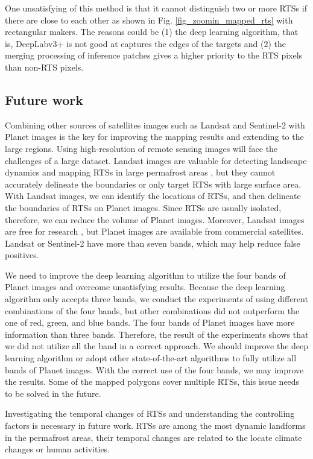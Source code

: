 \documentclass[preprint,12pt,authoryear]{elsarticle}
\begin{document}
One unsatisfying of this method is that it cannot distinguish two or more RTSs if there are close to each other as shown in Fig. \ref{fig_zoomin_mapped_rts} with rectangular makers. The reasons could be (1) the deep learning algorithm, that is, DeepLabv3+ is not good at captures the edges of the targets and (2) the merging processing of inference patches gives a higher priority to the RTS pixels than non-RTS pixels.

\subsection{Future work}
\label{subsec_future}

Combining other sources of satellites images such as Landsat and Sentinel-2 with Planet images is the key for improving the mapping results and extending to the large regions. Using high-resolution of remote sensing images will face the challenges of a large dataset. Landsat images are valuable for detecting landscape dynamics and mapping RTSs in large permafrost areas \citep{nitze_detection_2016, nitze_landsat-based_2017, nitze2018remote}, but they cannot accurately delineate the boundaries or only target RTSs with large surface area. With Landsat images, we can identify the locations of RTSs, and then delineate the boundaries of RTSs on Planet images. Since RTSs are usually isolated, therefore, we can reduce the volume of Planet images. Moreover, Landsat images are free for research \citep{zhu2019benefits}, but Planet images are available from commercial satellites. Landsat or Sentinel-2 have more than seven bands, which may help reduce false positives. 

We need to improve the deep learning algorithm to utilize the four bands of Planet images and overcome unsatisfying results. Because the deep learning algorithm only accepts three bands, we conduct the experiments of using different combinations of the four bands, but other combinations did not outperform the one of red, green, and blue bands. The four bands of Planet images have more information than three bands. Therefore, the result of the experiments shows that we did not utilize all the band in a correct approach. We should improve the deep learning algorithm or adopt other state-of-the-art algorithms to fully utilize all bands of Planet images. With the correct use of the four bands, we may improve the results. Some of the mapped polygons cover multiple RTSs, this issue needs to be solved in the future. 

Investigating the temporal changes of RTSs and understanding the controlling factors is necessary in future work. RTSs are among the most dynamic landforms in the permafrost areas, their temporal changes are related to the locate climate changes or human activities. 
\end{document}
